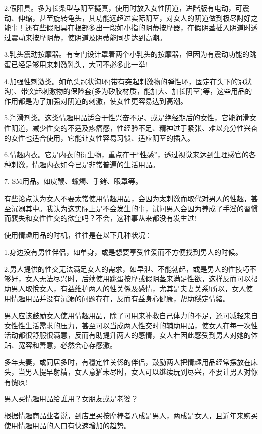 \documentclass[12pt,UTF8]{ctexbook}
\begin{document}
2.假阳具。多为长条型与阴茎擬真，使用时放入女性阴道，进階版有电动，可震动、伸缩，甚至旋转龟头，其功能远超过实际阴茎，对女人的阴道做到极尽討好之能事！还有些假阳具在根部多出一段如小指的阴蒂按摩器，在假阴茎插入阴道时透过震动来按摩阴蒂，使阴道及阴蒂能同步达到高潮。

3.乳头震动按摩器。有专门设计罩着两个小乳头的按摩器，但因为有震动功能的跳蛋已经足够用来刺激乳头，大可不必多此一举!

4.加强性刺激类。如龟头冠状沟环(带有突起刺激物的弹性环，固定在头下的冠状沟)、带突起刺激物的保险套(多为矽胶材质，能加大、加长阴茎)等，这些用品的作用都是为了加强对阴道的刺激，使女性更容易达到高潮。

5.润滑剂类。这类情趣用品适合于性兴奋不足、或是绝经期后的女性，它能润滑女性阴道，减少性交的不适及疼痛感，性经验不足、精神过于紧张、难以充分性兴奋的女性也适合使用，它能让女性容易习惯、适应阴茎的插入。

6.情趣内衣。它是内衣的衍生物，重点在于“性感”，透过视觉来达到生理感官的各种刺激，情趣内衣如今已是非常普遍的生活用品。

7. SM用品。如皮鞭、蠟燭、手銬、眼罩等。

有些论点认为女人不要太常使用情趣用品，会因为太刺激而取代对男人的性趣，甚至沉溺其中。我认为这实际上是不会发生的事，试问男人会因为养成了手淫的習惯而裵失和女性性交的欲望吗？不会，这种事从来都没有发生过!

使用情趣用品的时机，往往是在以下几种状况：

1.身边没有男性伴侣，如单身，或是想要享受性爱而不方便找到男人的时候。

2.男人提供的性交无法满足女人的需求，如早泄、不能勃起，或是男人的性技巧不够好，女人无法尽兴时，后续使用跳蛋按摩或假阴茎来满足性欲，这样反而可以帮助男人取悅女人，有益维护两人的性关係及感情，尤其是夫妻关系!所以，女人使用情趣用品并没有沉溺的问题存在，反而有益身心健康，帮助穩定情緒。

男人应该鼓励女人使用情趣用品，除了可用来补救自己体力的不足，还可减轻来自女性性生活需求的压力，甚至可以当成两人性交时的辅助用品，使女人在每一次性活动都很舒服很满意，反而有助提升两人的感情，女人若因此感受到男人对她的体贴、宽容和善意，必然会心存感激。

多年夫妻，或同居多时，有穩定性关係的伴侣，鼓励两人把情趣用品经常摆放在床头，当男人提早射精，女人意猶未尽时，女人可以继续玩到尽兴，不要让男人对你有愧疚!

男人买情趣用品给誰用？女朋友或是老婆？

根据情趣商品业者说，到店里买按摩棒者八成是男人，两成是女人，且近年来购买使用情趣用品的人口有快速增加的趋势。
\end{document}
